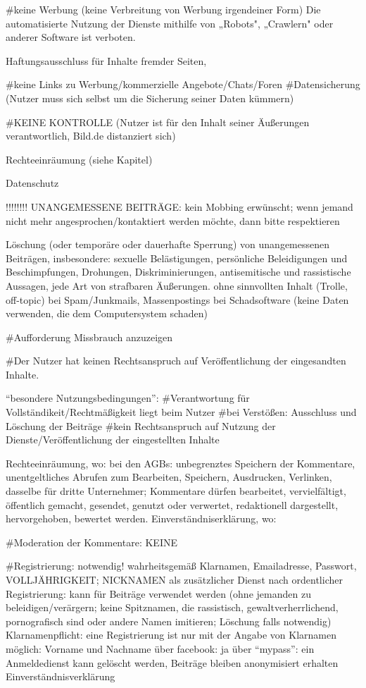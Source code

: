 	#keine Werbung (keine Verbreitung von Werbung irgendeiner Form)
	Die automatisierte Nutzung der Dienste mithilfe von „Robots", „Crawlern" oder anderer Software ist verboten.
	
	Haftungsausschluss für Inhalte fremder Seiten, 
	
	
	#keine Links zu Werbung/kommerzielle Angebote/Chats/Foren
	#Datensicherung (Nutzer muss sich selbst um die Sicherung seiner Daten kümmern)
	
	#KEINE KONTROLLE (Nutzer ist für den Inhalt seiner Äußerungen verantwortlich, Bild.de distanziert sich)
	
	Rechteeinräumung (siehe Kapitel)
	
	Datenschutz
	
	
!!!!!!!!	UNANGEMESSENE BEITRÄGE:
	kein Mobbing erwünscht; wenn jemand nicht mehr angesprochen/kontaktiert werden möchte, dann bitte respektieren
	
	Löschung (oder temporäre oder dauerhafte Sperrung) von unangemessenen Beiträgen, insbesondere:     
	sexuelle Belästigungen, 
	persönliche Beleidigungen und Beschimpfungen,
    	Drohungen,
    	Diskriminierungen,
    	antisemitische und rassistische Aussagen,
    	jede Art von strafbaren Äußerungen.
	ohne sinnvollten Inhalt (Trolle, off-topic)
	bei Spam/Junkmails, Massenpostings
	bei Schadsoftware (keine Daten verwenden, die dem Computersystem schaden)
	
	#Aufforderung Missbrauch anzuzeigen
	
	#Der Nutzer hat keinen Rechtsanspruch auf Veröffentlichung der eingesandten Inhalte.

	
	
	
	``besondere Nutzungsbedingungen'':
			#Verantwortung für Vollständikeit/Rechtmäßigkeit liegt beim Nutzer
			#bei Verstößen: Ausschluss und Löschung der Beiträge
			#kein Rechtsanspruch auf Nutzung der Dienste/Veröffentlichung der eingestellten Inhalte
			
			
			
			
	Rechteeinräumung, wo: bei den AGBs: 
	unbegrenztes Speichern der Kommentare, unentgeltliches Abrufen zum Bearbeiten, Speichern, Ausdrucken, Verlinken, dasselbe für dritte Unternehmer; 			Kommentare dürfen bearbeitet, vervielfältigt, öffentlich gemacht, gesendet, genutzt oder verwertet, redaktionell dargestellt, hervorgehoben, bewertet werden.
	Einverständniserklärung, wo:
	
#Moderation der Kommentare: KEINE




#Registrierung:  notwendig! wahrheitsgemäß Klarnamen, Emailadresse, Passwort, VOLLJÄHRIGKEIT; NICKNAMEN als zusätzlicher Dienst nach ordentlicher Registrierung: kann für Beiträge verwendet werden (ohne jemanden zu beleidigen/verärgern; keine Spitznamen, die rassistisch, gewaltverherrlichend, pornografisch sind oder andere Namen imitieren; Löschung falls notwendig)
	 Klarnamenpflicht: eine Registrierung ist nur mit der Angabe von Klarnamen möglich: Vorname und Nachname
	 über facebook: ja
	 über ``mypass'': ein Anmeldedienst 	
	 kann gelöscht werden, Beiträge bleiben anonymisiert erhalten
	 Einverständnisverklärung
	 

